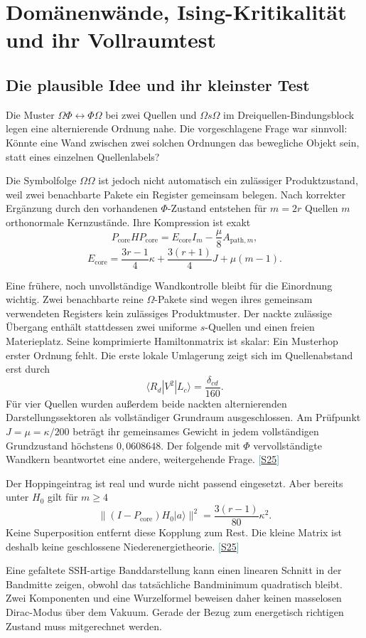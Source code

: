 \documentclass[11pt,a4paper,oneside,parskip=half,headings=normal,numbers=noenddot,bibliography=totoc]{scrreprt}
\newcommand{\ket}[1]{\lvert #1\rangle}
\newcommand{\src}[1]{\textcolor{teal}{\small[\hyperref[s:#1]{S#1}]}}
\begin{document}
\chapter{Domänenwände, Ising-Kritikalität und ihr Vollraumtest}
\section{Die plausible Idee und ihr kleinster Test}
Die Muster $\Omega\Phi\leftrightarrow\Phi\Omega$ bei zwei Quellen und $\Omega s\Omega$ im Dreiquellen-Bindungsblock legen eine alternierende Ordnung nahe. Die vorgeschlagene Frage war sinnvoll: Könnte eine Wand zwischen zwei solchen Ordnungen das bewegliche Objekt sein, statt eines einzelnen Quellenlabels?

Die Symbolfolge $\Omega\Omega$ ist jedoch nicht automatisch ein zulässiger Produktzustand, weil zwei benachbarte Pakete ein Register gemeinsam belegen. Nach korrekter Ergänzung durch den vorhandenen $\Phi$-Zustand entstehen für $m=2r$ Quellen $m$ orthonormale Kernzustände. Ihre Kompression ist exakt
\[
 P_{\mathrm{core}}HP_{\mathrm{core}}
 =E_{\mathrm{core}}I_m-\frac\mu8A_{\mathrm{path},m},
\]
\[
 E_{\mathrm{core}}=\frac{3r-1}{4}\kappa+\frac{3(r+1)}4J+\mu(m-1).
\]

Eine frühere, noch unvollständige Wandkontrolle bleibt für die Einordnung wichtig. Zwei benachbarte reine $\Omega$-Pakete sind wegen ihres gemeinsam verwendeten Registers kein zulässiges Produktmuster. Der nackte zulässige Übergang enthält stattdessen zwei uniforme $s$-Quellen und einen freien Materieplatz. Seine komprimierte Hamiltonmatrix ist skalar: Ein Musterhop erster Ordnung fehlt. Die erste lokale Umlagerung zeigt sich im Quellenabstand erst durch
\[
 \langle R_d|V^2|L_c\rangle=\frac{\delta_{cd}}{160}.
\]
Für vier Quellen wurden außerdem beide nackten alternierenden Darstellungssektoren als vollständiger Grundraum ausgeschlossen. Am Prüfpunkt $J=\mu=\kappa/200$ beträgt ihr gemeinsames Gewicht in jedem vollständigen Grundzustand höchstens $0{,}0608648$. Der folgende mit $\Phi$ vervollständigte Wandkern beantwortet eine andere, weitergehende Frage. \src{25}

Der Hoppingeintrag ist real und wurde nicht passend eingesetzt. Aber bereits unter $H_0$ gilt für $m\ge4$
\[
 \|(I-P_{\mathrm{core}})H_0\ket a\|^2
 =\frac{3(r-1)}{80}\kappa^2.
\]
Keine Superposition entfernt diese Kopplung zum Rest. Die kleine Matrix ist deshalb keine geschlossene Niederenergietheorie. \src{25}

Eine gefaltete SSH-artige Banddarstellung kann einen linearen Schnitt in der Bandmitte zeigen, obwohl das tatsächliche Bandminimum quadratisch bleibt. Zwei Komponenten und eine Wurzelformel beweisen daher keinen masselosen Dirac-Modus über dem Vakuum. Gerade der Bezug zum energetisch richtigen Zustand muss mitgerechnet werden.
\end{document}
